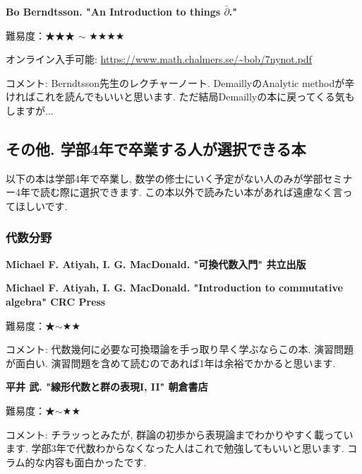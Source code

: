 \textbf{Bo Berndtsson. "An Introduction to things $\bar\partial$."}  　\vspace{-6pt} 

難易度：★★★ $\sim$ ★★★★  　\vspace{-6pt} 

オンライン入手可能: \url{https://www.math.chalmers.se/~bob/7nynot.pdf}\vspace{-6pt}

コメント: Berndtsson先生のレクチャーノート. DemaillyのAnalytic methodが辛ければこれを読んでもいいと思います. ただ結局Demaillyの本に戻ってくる気もしますが...

\subsection{その他. 学部4年で卒業する人が選択できる本}
\label{subsec-seminar-23}

以下の本は学部4年で卒業し, 数学の修士にいく予定がない人のみが学部セミナー4年で読む際に選択できます. 
この本以外で読みたい本があれば遠慮なく言ってほしいです. 

\subsubsection{代数分野}

\textbf{Michael F. Atiyah, I. G. MacDonald. "可換代数入門" 共立出版}  　\vspace{-6pt} 

\textbf{Michael F. Atiyah, I. G. MacDonald. "Introduction to commutative algebra" CRC Press}  　\vspace{-6pt} 

難易度：★$\sim$★★ 　\vspace{-6pt} 

コメント: 代数幾何に必要な可換環論を手っ取り早く学ぶならこの本. 演習問題が面白い. 
演習問題を含めて読むのであれば1年は余裕でかかると思います. 

\vspace{8pt}

\textbf{平井 武. "線形代数と群の表現I, II" 朝倉書店}  　\vspace{-6pt} 


難易度：★$\sim$★★ 　 　\vspace{-6pt} 

コメント: チラッっとみたが, 群論の初歩から表現論までわかりやすく載っています. 学部3年で代数わからなくなった人はこれで勉強してもいいと思います. コラム的な内容も面白かったです. 

